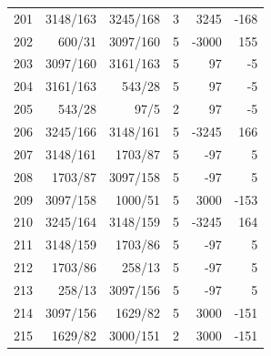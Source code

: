 \documentclass[11pt,a4paper]{article}
\begin{document}
\begin{minipage}[t]{.49\linewidth}
\begin{tabular*}{\linewidth}{@{}r@{\extracolsep{\fill}}rrrrr@{}}
201 & 3148/163 & 3245/168 & 3 & 3245 & -168\\
202 & 600/31 & 3097/160 & 5 & -3000 & 155\\
203 & 3097/160 & 3161/163 & 5 & 97 & -5\\
204 & 3161/163 & 543/28 & 5 & 97 & -5\\
205 & 543/28 & 97/5 & 2 & 97 & -5\\
206 & 3245/166 & 3148/161 & 5 & -3245 & 166\\
207 & 3148/161 & 1703/87 & 5 & -97 & 5\\
208 & 1703/87 & 3097/158 & 5 & -97 & 5\\
209 & 3097/158 & 1000/51 & 5 & 3000 & -153\\
210 & 3245/164 & 3148/159 & 5 & -3245 & 164\\
211 & 3148/159 & 1703/86 & 5 & -97 & 5\\
212 & 1703/86 & 258/13 & 5 & -97 & 5\\
213 & 258/13 & 3097/156 & 5 & -97 & 5\\
214 & 3097/156 & 1629/82 & 5 & 3000 & -151\\
215 & 1629/82 & 3000/151 & 2 & 3000 & -151\\
\bottomrule\end{tabular*}\end{minipage}\hfill
\end{document}
